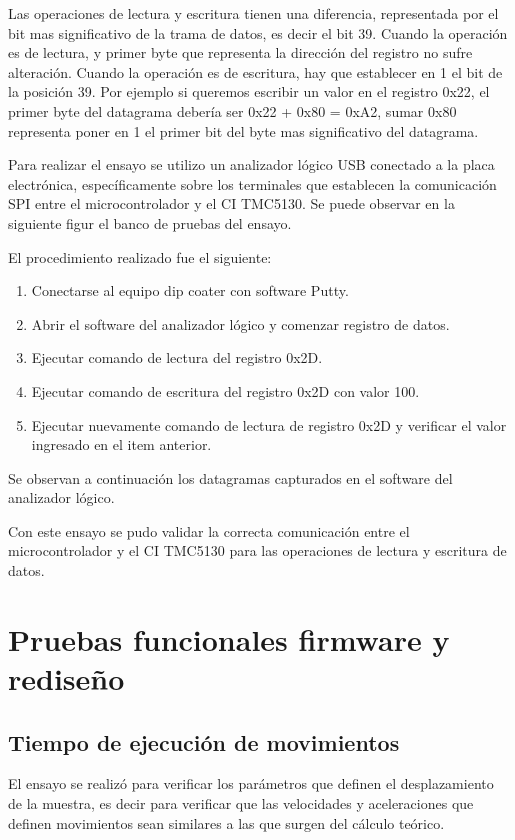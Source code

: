 Las operaciones de lectura y escritura tienen una diferencia, representada por el bit mas significativo de la trama de datos, es decir el bit 39. Cuando la operación es de lectura, y primer byte que representa la dirección del registro no sufre alteración. Cuando la operación es de escritura, hay que establecer en 1 el bit de la posición 39. Por ejemplo si queremos escribir un valor en el registro 0x22, el primer byte del datagrama debería ser 0x22 + 0x80 = 0xA2,  sumar 0x80 representa poner en 1 el primer bit del byte mas significativo del datagrama. 


Para realizar el ensayo se utilizo un analizador lógico USB conectado a la placa electrónica, específicamente sobre los terminales que establecen la comunicación SPI entre el microcontrolador y el CI TMC5130. Se puede observar en la siguiente figur  el banco de pruebas del ensayo.

El procedimiento realizado fue el siguiente:
\begin{enumerate}
\item Conectarse al equipo dip coater con software Putty.
\item Abrir el software del analizador lógico y comenzar registro de datos.
\item Ejecutar comando de lectura del registro 0x2D.
\item Ejecutar comando de escritura del registro 0x2D con valor 100.
\item Ejecutar nuevamente comando de lectura de registro 0x2D y verificar el valor ingresado en el item anterior. 
\end{enumerate}

Se observan a continuación los datagramas capturados en el software del analizador lógico.



Con este ensayo se pudo validar la correcta comunicación entre el microcontrolador y el CI TMC5130 para las operaciones de lectura y escritura de datos.

\section{Pruebas funcionales firmware y rediseño}
\subsection{Tiempo de ejecución de movimientos}

El ensayo se realizó para verificar los parámetros que definen el desplazamiento de la muestra, es decir para verificar que las velocidades y aceleraciones que definen movimientos sean similares a las que surgen del cálculo teórico.

